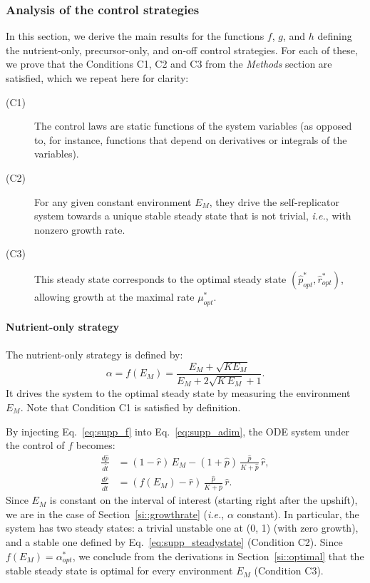 \subsubsection{Analysis of the control strategies}
\label{si::control_strategies}

In this section, we derive the main results for the functions $f$, $g$, and $h$ defining the nutrient-only, precursor-only, and on-off control strategies.
For each of these, we prove that the Conditions C1, C2 and C3 from the \textit{Methods} section are satisfied, which we repeat here for clarity:
\begin{description}
\item[(C1)] The control laws are static functions of the system variables (as opposed to, for instance, functions that depend on derivatives or integrals of the variables).
\item[(C2)] For any given constant environment $E_M$, they drive the self-replicator system towards a unique stable steady state that is not trivial, \textit{i.e.}, with nonzero growth rate.
\item[(C3)] This steady state corresponds to the optimal steady state $(\hat{p}_{opt}^*, \hat{r}_{opt}^*)$, allowing growth at the maximal rate $\mu^*_{opt}$.
\end{description}

\paragraph{Nutrient-only strategy}

The nutrient-only strategy is defined by:
\begin{equation}
\label{eq:supp_f}
\alpha = f(E_M) = \frac{E_M + \sqrt{K E_M}}{E_M + 2\sqrt{K\, E_M} + 1}.
\end{equation}
It drives the system to the optimal steady state by measuring the environment $E_M$.
Note that Condition C1 is satisfied by definition.

By injecting Eq.~\ref{eq:supp_f} into Eq.~\ref{eq:supp_adim}, the ODE system under the control of $f$ becomes:
\begin{equation}
\label{eq:supp_adim_f}
\begin{aligned}
\frac{d\hat{p}}{d\hat{t}} &= (1-\hat{r})\, E_M - (1 + \hat{p}) \, \frac{\hat{p}}{K + \hat{p}}\, \hat{r},\\
\frac{d\hat{r}}{d\hat{t}} &= \left(f(E_M) - \hat{r} \right) \, \frac{\hat{p}}{K + \hat{p}}\, \hat{r}.
\end{aligned}
\end{equation}
Since $E_M$ is constant on the interval of interest (starting right after the upshift), we are in the case of Section~\ref{si::growthrate} (\textit{i.e.}, $\alpha$ constant).
In particular, the system has two steady states: a trivial unstable one at (0, 1) (with zero growth), and a stable one defined by Eq.~\ref{eq:supp_steadystate} (Condition C2).
Since $f(E_M) = \alpha_{opt}^*$, we conclude from the derivations in Section~\ref{si::optimal} that the stable steady state is optimal for every environment $E_M$ (Condition C3).

